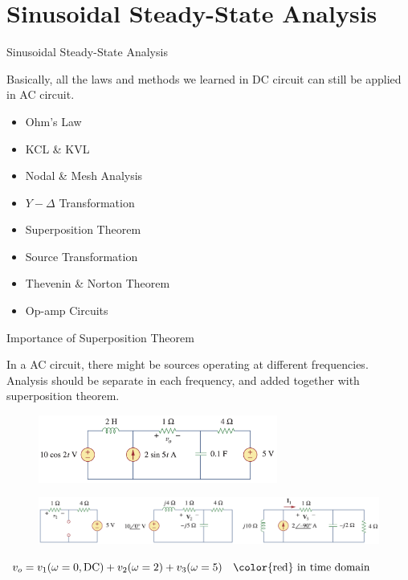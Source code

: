 \documentclass{beamer}
\begin{document}

\section{Sinusoidal Steady-State Analysis}

\begin{frame}{Sinusoidal Steady-State Analysis}

Basically, all the laws and methods we learned in DC circuit can still be applied in AC circuit.
\begin{itemize}
    \item Ohm’s Law
    \item KCL \& KVL
    \item Nodal \& Mesh Analysis
    \item $Y-\Delta$ Transformation
    \item \color{red}Superposition Theorem\color{black}
    \item Source Transformation
    \item Thevenin \& Norton Theorem
    \item Op-amp Circuits
\end{itemize}
    
\end{frame}

\begin{frame}{Importance of Superposition Theorem}

In a AC circuit, there might be sources operating at different frequencies. Analysis should be separate in each frequency, and added together with superposition theorem.

\begin{figure}
    \centering
    \includegraphics[width=0.7\textwidth]{img_ch10/1_example.png}
\end{figure}

\begin{figure}
    \centering
    \includegraphics[width=\textwidth]{img_ch10/2_super.png}
\end{figure}
\begin{center}
    $v_o = v_1(\omega=0, \text{DC}) + v_2(\omega=2) + v_3(\omega=5) \quad\text{\color{red} in time domain}$
\end{center}

\end{frame}
 
\end{document}
